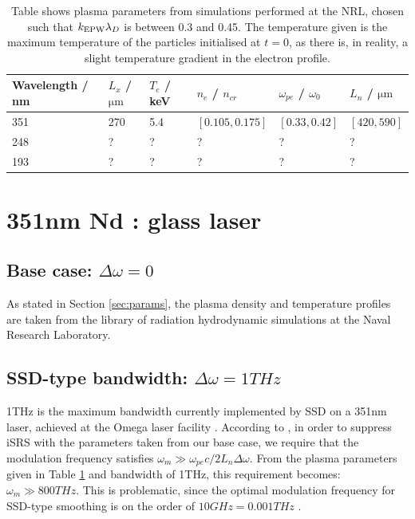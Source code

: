 \begin{table}[h]
\begin{center}

\begin{tabular}{|l|l|l|l|l|l|}
\hline
Wavelength / nm & $L_x$ /$\si{\micro\metre}$ & $T_e$ / keV & $n_e$ / $n_{cr}$ & $\omega_{pe}$ / $\omega_0$ & $L_n$ / $\si{\micro\metre}$
\\ \hline 
351 & 270 & 5.4 & $[0.105,0.175]$ & $[0.33,0.42]$ &  $[420,590]$ \\ \hline
248 & ? & ? & ? & ? &  ? \\ \hline
193 & ? & ?  & ?   & ?               & ? \\ \hline

\end{tabular}

\end{center}
\caption{Table shows plasma parameters from simulations performed at the NRL, chosen such that $k_\mathrm{EPW}\lambda_D$ is between 0.3 and 0.45. The temperature given is the maximum temperature of the particles initialised at $t=0$, as there is, in reality, a slight temperature gradient in the electron profile.}
\label{tab:plasma}
\end{table}




\section{351nm Nd : glass laser}\label{sec:351}

\subsection{Base case: $\Delta\omega=0$}
As stated in Section \ref{sec:params}, the plasma density and temperature profiles are taken from the library of radiation hydrodynamic simulations at the Naval Research Laboratory. 

\subsection{SSD-type bandwidth: $\Delta\omega=1\si{THz}$}
1THz is the maximum bandwidth currently implemented by SSD on a 351nm laser, achieved at the Omega laser facility \citep{Regan2005}. According to \citet{Wen2021}, in order to suppress iSRS with the parameters taken from our base case, we require that the modulation frequency satisfies $\omega_m \gg \omega_{pe} c / 2L_n\Delta\omega$. From the plasma parameters given in Table \ref{tab:plasma} and bandwidth of 1THz, this requirement becomes: $\omega_m \gg 800 \si{THz}$. This is problematic, since the optimal modulation frequency for SSD-type smoothing is on the order of $10 \si{GHz} = 0.001 \si{THz}$ \citep{Kelly2013}.

